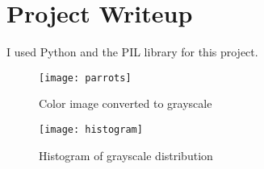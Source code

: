 \documentclass[11pt]{article}  %
\begin{document}
\section{Project Writeup}

I used Python and the PIL library for this project.

\begin{figure}
\centering
\texttt{[image: parrots]}
\caption{Color image converted to grayscale}
\label{grayscale}
\end{figure}

\begin{figure}
\centering
\texttt{[image: histogram]}
\caption{Histogram of grayscale distribution}
\label{histogram}
\end{figure}

\end{document}
